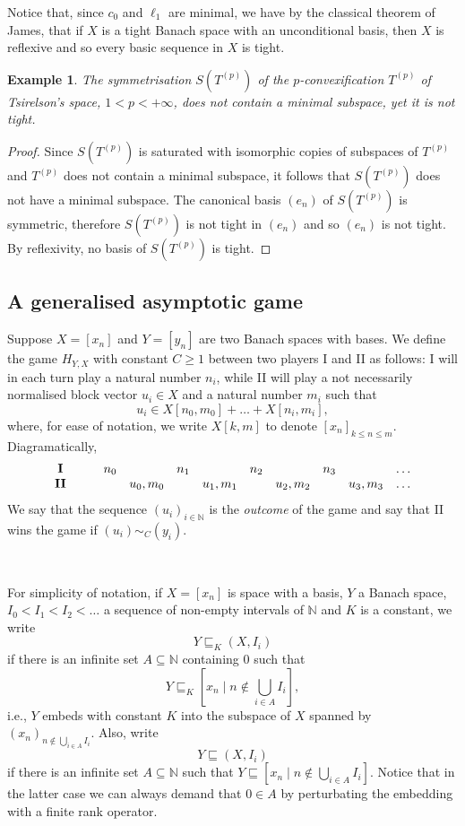 \documentclass[10pt]{amsart}
\numberwithin{equation}{section}
\newtheorem{ex}[thm]{Example}
\begin{document}
Notice that, since $c_0$ and $\ell_1$ are minimal, we have by the classical
theorem of James, that if $X$ is a tight Banach space with an unconditional
basis, then $X$ is reflexive and so every basic sequence in $X$ is tight.

\begin{ex}\label{ex}
The symmetrisation $S(T^{(p)})$  of the $p$-convexification $T^{(p)}$ of
Tsirel\-son's space, $1<p<+\infty$, does not contain a minimal subspace, yet it
is not tight.
\end{ex}
\begin{proof}
Since $S(T^{(p)})$ is saturated with isomorphic copies of subspaces of
$T^{(p)}$ and $T^{(p)}$ does not contain a minimal subspace, it follows that
$S(T^{(p)})$ does not have a minimal subspace. The canonical basis $(e_n)$ of
$S(T^{(p)})$ is symmetric, therefore $S(T^{(p)})$ is not tight in $(e_n)$ and
so $(e_n)$ is not tight. By reflexivity, no basis of $S(T^{(p)})$ is tight.
\end{proof}

\subsection{A generalised asymptotic game}
Suppose  $X=[x_n]$ and $Y=[y_n]$ are two Banach spaces with bases.
We define the game $H_{Y,X}$ with constant $C {\ensuremath{\geqslant}} 1$ between two
players I and II as follows: I will in each turn play a natural number $n_i$, while II will play
a not necessarily normalised block vector $u_i\in X$ and a natural number $m_i$ such that
$$
u_i\in X[n_0,m_0]+\ldots +X[n_i,m_i],
$$
where, for ease of notation,  we write $X[k,m]$ to denote $[x_n]_{k{\ensuremath{\leqslant}} n{\ensuremath{\leqslant}} m}$.
Diagramatically,
$$
\begin{array}{cccccccccccc}
{\bf I} & & & n_0 &  & n_1 &  & n_2 & & n_3& &\ldots \\
{\bf II} & & &  & u_0,m_0 &  & u_1, m_1 &  & u_2,m_2 & & u_3,m_3 &\ldots
\end{array}
$$
We say that the sequence $(u_i)_{i\in {\mathbb N}}$ is the {\em outcome} of the game and say that II wins the game if $(u_i)\sim_{C}(y_i)$.

\

For simplicity of notation, if $X=[x_n]$ is space with a basis, $Y$ a Banach
space,  $I_0<I_1<I_2<\ldots$  a sequence of non-empty intervals of ${\mathbb N}$ and $K$
is a constant, we write
$$
Y\sqsubseteq _K(X,I_i)
$$
if there is an infinite set $A\subseteq {\mathbb N}$ containing $0$ such that
$$
Y\sqsubseteq_K [x_n{ \; \big| \;} n\notin \bigcup_{i\in A}I_i],
$$
i.e., $Y$ embeds with constant $K$ into the subspace of $X$ spanned by $(x_n)_{n\notin \bigcup_{i\in A}I_i}$. Also, write
$$
Y\sqsubseteq (X,I_i)
$$
if there is an infinite set $A\subseteq {\mathbb N}$ such that $Y\sqsubseteq [x_n{ \; \big| \;}
n\notin \bigcup_{i\in A}I_i]$. Notice that in the latter case we can always
demand that $0\in A$ by perturbating the embedding with a finite rank operator.
\end{document}
